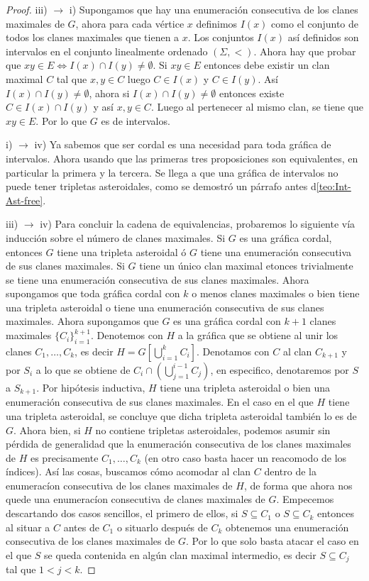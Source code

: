 \begin{proof}
    iii) $\to$ i) Supongamos que hay una enumeración consecutiva de los clanes
    maximales de $G$, ahora para cada vértice $x$ definimos $I(x)$ como el
    conjunto de todos los clanes maximales que tienen a $x$. Los conjuntos
    $I(x)$ así definidos son intervalos en el conjunto linealmente ordenado
    $(\Sigma,<)$. Ahora hay que probar que $xy\in E \Leftrightarrow I(x)\cap
    I(y)\neq \emptyset$. Si $xy\in E$ entonces debe existir un clan maximal $C$
    tal que $x,y \in C$ luego $C\in I(x)$ y $C\in I(y)$. Así $I(x)\cap I(y)\neq
    \emptyset$, ahora si $I(x)\cap I(y)\neq \emptyset$ entonces existe $C\in
    I(x)\cap I(y)$ y así $x,y\in C$. Luego al pertenecer al mismo clan, se tiene
    que $xy\in E$. Por lo que $G$ es de intervalos.
    
    i) $\to $ iv) Ya sabemos que ser cordal es una necesidad para toda gráfica
    de intervalos. Ahora usando que las primeras tres proposiciones son
    equivalentes, en particular la primera y la tercera. Se llega a que una
    gráfica de intervalos no puede tener tripletas asteroidales, como se
    demostró un párrafo antes d\cref{teo:Int-Ast-free}.    

    iii) $\to$ iv) Para concluir la cadena de equivalencias, probaremos lo
    siguiente vía inducción sobre el número de clanes maximales. Si $G $ es una
    gráfica cordal, entonces $G$ tiene una tripleta asteroidal ó $G$ tiene una
    enumeración consecutiva de sus clanes maximales. Si $G$ tiene un único clan
    maximal etonces trivialmente se tiene una enumeración consecutiva de sus
    clanes maximales.  Ahora supongamos que toda gráfica cordal con $k$ o menos
    clanes maximales o bien tiene una tripleta asteroidal o tiene una
    enumeración consecutiva de sus clanes maximales. Ahora supongamos que $G$ es
    una gráfica cordal con $k+1$ clanes maximales $\{C_i\}_{i=1}^{k+1}$.
    Denotemos con $H$ a la gráfica que se obtiene al unir los clanes $C_1, \dots
    , C_k$, es decir $H=G[\bigcup_{i=1}^k C_i ]$. Denotamos con $C$ al clan
    $C_{k+1}$ y por $S_i$ a lo que se obtiene de $C_{i}\cap (\bigcup_{j=1}^{i-1}
    C_j)$, en especifico, denotaremos por $S$ a $S_{k+1}$. Por hipótesis
    inductiva, $H$ tiene una tripleta asteroidal o bien una enumeración
    consecutiva de sus clanes maximales. En el caso en el que $H$ tiene una
    tripleta asteroidal, se concluye que dicha tripleta asteroidal también lo es
    de $G$. Ahora bien, si $H$ no contiene tripletas asteroidales, podemos
    asumir sin pérdida de generalidad que la enumeración consecutiva de los
    clanes maximales de $H$ es precisamente $C_1,\dots, C_k$ (en otro caso basta
    hacer un reacomodo de los índices). Así las cosas, buscamos cómo acomodar al
    clan $C$ dentro de la enumeracíon consecutiva de los clanes maximales de
    $H$, de forma que ahora nos quede una enumeracíon consecutiva de clanes
    maximales de $G$. Empecemos descartando dos casos sencillos, el primero de
    ellos, si $S\subseteq C_1$ o $S\subseteq C_k$ entonces al situar a $C$ antes
    de $C_1$ o situarlo después de $C_k$ obtenemos una enumeración consecutiva
    de los clanes maximales de $G$. Por lo que solo basta atacar el caso en el
    que $S$ se queda contenida en algún clan maximal intermedio, es decir
    $S\subseteq C_j$ tal que $1<j<k$. 


\end{proof}
